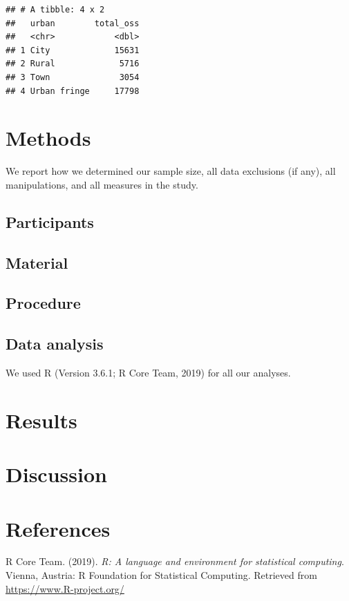 \documentclass[man]{apa6}
\begin{document}
\begin{verbatim}
## # A tibble: 4 x 2
##   urban        total_oss
##   <chr>            <dbl>
## 1 City             15631
## 2 Rural             5716
## 3 Town              3054
## 4 Urban fringe     17798
\end{verbatim}

\section{Methods}\label{methods}

We report how we determined our sample size, all data exclusions (if
any), all manipulations, and all measures in the study.

\subsection{Participants}\label{participants}

\subsection{Material}\label{material}

\subsection{Procedure}\label{procedure}

\subsection{Data analysis}\label{data-analysis}

We used R (Version 3.6.1; R Core Team, 2019) for all our analyses.

\section{Results}\label{results}

\section{Discussion}\label{discussion}

\newpage

\section{References}\label{references}

\begingroup
\setlength{\parindent}{-0.5in} \setlength{\leftskip}{0.5in}

\hypertarget{refs}{}
\hypertarget{ref-R-base}{}
R Core Team. (2019). \emph{R: A language and environment for statistical
computing}. Vienna, Austria: R Foundation for Statistical Computing.
Retrieved from \url{https://www.R-project.org/}

\endgroup
\end{document}
